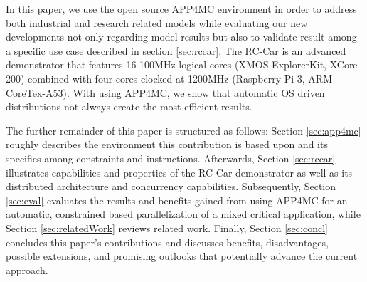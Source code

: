 \documentclass [a4paper,final,conference,10pt]{IDAACS}
\begin{document}
In this paper, we use the open source APP4MC environment in order to address both industrial and research related models while evaluating our new developments not only regarding model results but also to validate result among a specific use case described in section \ref{sec:rccar}. The RC-Car is an advanced demonstrator that features 16 100MHz logical cores (XMOS ExplorerKit, XCore-200) 
combined with four cores clocked at 1200MHz (Raspberry Pi 3, ARM CoreTex-A53). With using APP4MC, we show that automatic OS driven distributions not always create the most efficient results.

The further remainder of this paper is structured as follows: Section \ref{sec:app4mc} roughly describes the environment this contribution is based upon and its specifics among constraints and instructions. Afterwards, Section \ref{sec:rccar} illustrates capabilities and properties of the RC-Car demonstrator as well as its distributed architecture and concurrency capabilities. Subsequently, Section \ref{sec:eval} evaluates the results and benefits gained from using APP4MC for an automatic, constrained based parallelization of a mixed critical application, while Section \ref{sec:relatedWork} reviews related work.  %
Finally, Section \ref{sec:concl} concludes this paper's contributions and discusses benefits, disadvantages, possible extensions, and promising outlooks that potentially advance the current approach.
\end{document}
